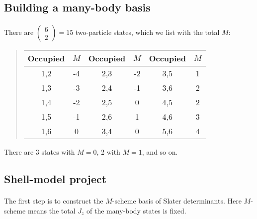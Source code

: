 \noindent



\subsection*{Building a many-body basis}

\paragraph{}
There are $\left ( \begin{array}{c} 6 \\ 2 \end{array} \right) = 15$ two-particle states, 
which we list with the total $M$:


\begin{quote}
\begin{tabular}{cccccc}
\hline
\multicolumn{1}{c}{ Occupied } & \multicolumn{1}{c}{ $M$ } & \multicolumn{1}{c}{ Occupied } & \multicolumn{1}{c}{ $M$ } & \multicolumn{1}{c}{ Occupied } & \multicolumn{1}{c}{ $M$ } \\
\hline
1,2      & -4  & 2,3      & -2  & 3,5      & 1   \\
1,3      & -3  & 2,4      & -1  & 3,6      & 2   \\
1,4      & -2  & 2,5      & 0   & 4,5      & 2   \\
1,5      & -1  & 2,6      & 1   & 4,6      & 3   \\
1,6      & 0   & 3,4      & 0   & 5,6      & 4   \\
\hline
\end{tabular}
\end{quote}

\noindent
There are 3 states with $M= 0$, 2 with $M = 1$, and so on.



\subsection*{Shell-model project}

\paragraph{}

The first step  is to construct the $M$-scheme basis of Slater determinants.
Here $M$-scheme means the total $J_z$ of the many-body states is fixed.

